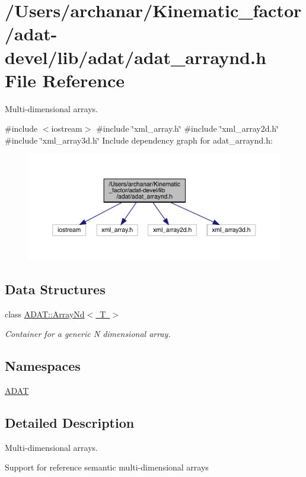 \hypertarget{adat-devel_2lib_2adat_2adat__arraynd_8h}{}\section{/\+Users/archanar/\+Kinematic\+\_\+factor/adat-\/devel/lib/adat/adat\+\_\+arraynd.h File Reference}
\label{adat-devel_2lib_2adat_2adat__arraynd_8h}


Multi-\/dimensional arrays.  


{\ttfamily \#include $<$iostream$>$}\newline
{\ttfamily \#include \char`\"{}xml\+\_\+array.\+h\char`\"{}}\newline
{\ttfamily \#include \char`\"{}xml\+\_\+array2d.\+h\char`\"{}}\newline
{\ttfamily \#include \char`\"{}xml\+\_\+array3d.\+h\char`\"{}}\newline
Include dependency graph for adat\+\_\+arraynd.\+h\+:
\nopagebreak
\begin{figure}[H]
\begin{center}
\leavevmode
\includegraphics[width=350pt]{d6/d4c/adat-devel_2lib_2adat_2adat__arraynd_8h__incl}
\end{center}
\end{figure}
\subsection*{Data Structures}
\begin{DoxyCompactItemize}
\item 
class \mbox{\hyperlink{classADAT_1_1ArrayNd}{A\+D\+A\+T\+::\+Array\+Nd$<$ T $>$}}
\begin{DoxyCompactList}\small\item\em Container for a generic N dimensional array. \end{DoxyCompactList}\end{DoxyCompactItemize}
\subsection*{Namespaces}
\begin{DoxyCompactItemize}
\item 
 \mbox{\hyperlink{namespaceADAT}{A\+D\+AT}}
\end{DoxyCompactItemize}


\subsection{Detailed Description}
Multi-\/dimensional arrays. 

Support for reference semantic multi-\/dimensional arrays 